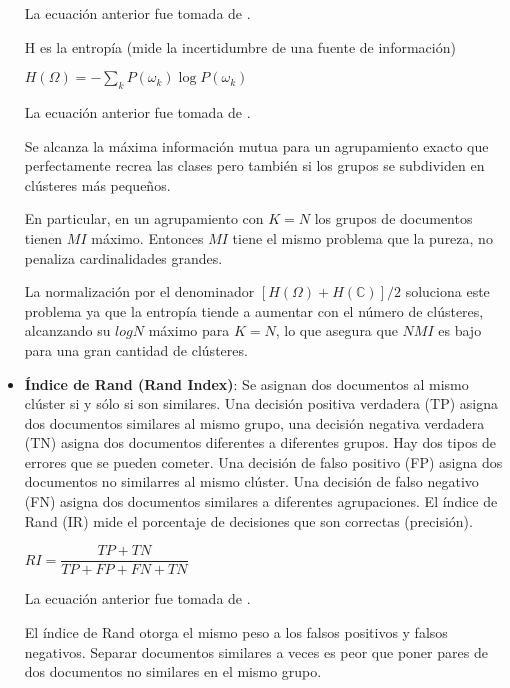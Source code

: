 \documentclass{llncs}
\begin{document}
\begin{itemize}
	La ecuaci\'on anterior fue tomada de \cite[Ecuaci\'on 16.3, p.358]{B1}.
	
	\vspace{0.5em}
	H es la entropía (mide la incertidumbre de una fuente de información)
	
	\begin{center}
		$ H(\Omega) = -\sum_{k}P(\omega_{k}) \log P(\omega_{k}) $ 
	\end{center}
	
	La ecuaci\'on anterior fue tomada de \cite[Ecuaci\'on 16.5, p.358]{B1}. 
	
	Se alcanza la máxima información mutua para un agrupamiento exacto que perfectamente recrea las clases pero también si los grupos se subdividen en cl\'usteres más pequeños. 
	
	En particular, en un agrupamiento con $ K = N $ los grupos de documentos tienen $ MI $ máximo. Entonces $ MI $ tiene el mismo problema que la pureza, no penaliza cardinalidades grandes.
	
	La normalización por el denominador $ [H(\Omega) + H(\mathbb{C})]/2 $ soluciona este problema ya que la entropía tiende a aumentar con el número de cl\'usteres, alcanzando su $ log N $ máximo para $ K = N $, lo que asegura que $ NMI $ es bajo para una gran cantidad de cl\'usteres.
	
	\vspace{1em}
	\item \textbf{\'Indice de Rand (Rand Index)}: Se asignan dos documentos al mismo clúster si y sólo si son similares. Una decisión positiva verdadera (TP) asigna
	dos documentos similares al mismo grupo, una decisión negativa verdadera (TN) asigna dos documentos diferentes a diferentes grupos. Hay dos tipos
	de errores que se pueden cometer. Una decisión de falso positivo (FP) asigna dos documentos no similarres al mismo clúster. Una decisión de falso negativo (FN) asigna
	dos documentos similares a diferentes agrupaciones. El índice de Rand (IR) mide el porcentaje de decisiones que son correctas (precisión).
	
	\begin{center}
		$ RI = \dfrac{TP + TN}{TP + FP + FN + TN} $ 
	\end{center}
	
	La ecuaci\'on anterior fue tomada de \cite[Secci\'on 8.3, p.155]{B1}.
	
	El índice de Rand otorga el mismo peso a los falsos positivos y falsos negativos. Separar documentos similares a veces es peor que poner pares de dos documentos no similares en el mismo grupo.
	

\end{itemize}
\end{document}
